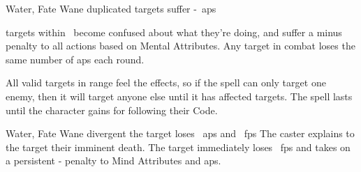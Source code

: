   {Water, Fate}%
  {Wane}%
  {duplicated}%
  {}%
  { targets suffer -~\glspl{ap}}%
  {
     targets within \spellRange\ become confused about what they're doing, and suffer a minus  penalty to all actions based on Mental Attributes.
    Any target in combat loses the same number of \glspl{ap} each round.

    All valid targets in range feel the effects, so if the spell can only target one enemy, then it will target anyone else until it has affected  targets.
    The spell lasts until the character gains  for following their Code.
  }

  {Water, Fate}%
  {Wane}%
  {divergent}%
  {}%
  {the target loses ~\glspl{ap} and \showDam~\glspl{fp}}%
  {
    The caster explains to the target their imminent death.
    The target immediately loses \showDam\ \glspl{fp} and takes on a persistent - penalty to Mind Attributes and \glspl{ap}.
  }
